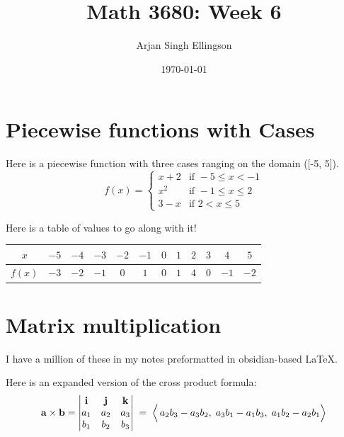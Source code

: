 \documentclass{article} %
\title{Math 3680: Week 6}
\author{Arjan Singh Ellingson}
\date{\today}
\begin{document}
\maketitle
\tableofcontents

\section{Piecewise functions with Cases}
Here is a piecewise function with three cases ranging on the domain ([-5, 5]).
\begin{equation*}
    f(x) =
    \begin{cases}
        x + 2 & \text{if } -5 \le x < -1  \\
        x^2   & \text{if } -1 \le x \le 2 \\
        3 - x & \text{if } 2 < x \le 5
    \end{cases}
\end{equation*}


Here is a table of values to go along with it!

\begin{center}
    \begin{tabular}{|c|c|c|c|c|c|c|c|c|c|c|c|}\hline
        $x$    & $-5$ & $-4$ & $-3$ & $-2$ & $-1$ & $0$ & $1$ & $2$ & $3$ & $4$  & $5$  \\
        \hline
        $f(x)$ & $-3$ & $-2$ & $-1$ & $0$  & $1$  & $0$ & $1$ & $4$ & $0$ & $-1$ & $-2$ \\
        \hline
    \end{tabular}
\end{center}

\section{Matrix multiplication}
I have a million of these in my notes preformatted in obsidian-based \LaTeX. 

Here is an expanded version of the cross product formula:
\[
\mathbf{a}\times\mathbf{b}
=
\begin{vmatrix}
\mathbf{i} & \mathbf{j} & \mathbf{k}\\
a_1 & a_2 & a_3\\
b_1 & b_2 & b_3
\end{vmatrix}
\;=\;
\Bigl\langle
\,a_2b_3-a_3b_2,\;
a_3b_1-a_1b_3,\;
a_1b_2-a_2b_1
\Bigr\rangle
\]
\end{document}
